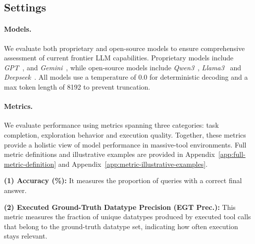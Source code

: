 \documentclass{llmxive}
\begin{document}





\subsection{Settings}

\paragraph{Models.}

We evaluate both proprietary and open-source models to ensure comprehensive assessment of current frontier LLM capabilities.
Proprietary models include 
\textit{GPT}~\citep{GPT-5.4}, and \textit{Gemini}~\citep{Gemini-3.1-Pro}, while open-source models include \textit{Qwen3}~\citep{Qwen3}, \textit{Llama3}~\citep{Llama-3} and \textit{Deepseek}~\citep{DeepSeek-V4}. 
All models use a temperature of 0.0 for deterministic decoding and a max token length of 8192 to prevent truncation.

\paragraph{Metrics.}
 
We evaluate performance using metrics spanning three categories: task completion, exploration behavior and execution quality.
Together, these metrics provide a holistic view of model performance in massive-tool environments.
Full metric definitions and illustrative examples are provided in Appendix~\ref{app:full-metric-definition} and Appendix~\ref{app:metric-illustrative-examples}.

\noindent \textbf{(1) Accuracy (\%):} It measures the proportion of queries with a correct final answer.


\noindent \textbf{(2) Executed Ground-Truth Datatype Precision (EGT Prec.):} This metric measures the fraction of unique datatypes produced by executed tool calls that belong to the ground-truth datatype set, indicating how often execution stays relevant.
\end{document}
